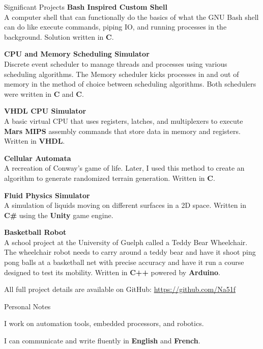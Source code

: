 \documentclass{resume}
\begin{document}
    \begin{rSection}{Significant Projects}
        \textbf{Bash Inspired Custom Shell} \\
        A computer shell that can functionally do the basics of what the GNU Bash shell can do like execute commands, piping IO, and running processes in the background. Solution written in \textbf{C}.

        \textbf{CPU and Memory Scheduling Simulator} \\
        Discrete event scheduler to manage threads and processes using various scheduling algorithms. The Memory scheduler kicks processes in and out of memory in the method of choice between scheduling algorithms. Both schedulers were written in \textbf{C} and \textbf{C}.

        \textbf{VHDL CPU Simulator} \\
        A basic virtual CPU that uses registers, latches, and multiplexers to execute \textbf{Mars MIPS} assembly commands that store data in memory and registers. Written in \textbf{VHDL}.

        \textbf{Cellular Automata} \\ 
        A recreation of Conway's game of life. Later, I used this method to create an algorithm to generate randomized terrain generation. Written in \textbf{C}.

        \textbf{Fluid Physics Simulator} \\ 
        A simulation of liquids moving on different surfaces in a 2D space. Written in \textbf{C\#} using the \textbf{Unity} game engine.

        \textbf{Basketball Robot} \\ 
        A school project at the University of Guelph called a Teddy Bear Wheelchair. The wheelchair robot needs to carry around a teddy bear and have it shoot ping pong balls at a basketball net with precise accuracy and have it run a course designed to test its mobility. Written in \textbf{C++} powered by \textbf{Arduino}.

        All full project details are available on GitHub: \url{https://github.com/Na51f}
    \end{rSection}

    \begin{rSection}{Personal Notes}
        \item I work on automation tools, embedded processors, and robotics.
        \item I can communicate and write fluently in \textbf{English} and \textbf{French}.
    \end{rSection}
\end{document}

